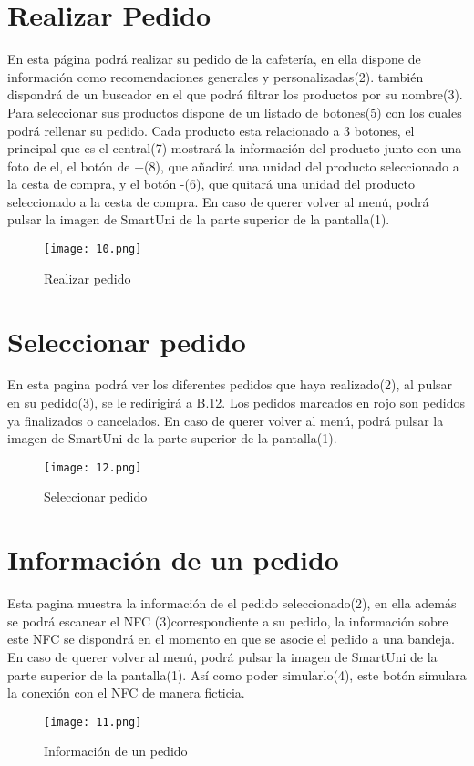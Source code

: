 \documentclass[12pt]{report}
\begin{document}
\begin{appendices}
\section{Realizar Pedido}
En esta página podrá realizar su pedido de la cafetería, en ella dispone de información como recomendaciones generales y personalizadas(2). también dispondrá de un buscador en el que podrá filtrar los productos por su nombre(3). Para seleccionar sus productos dispone de un listado de botones(5) con los cuales podrá rellenar su pedido. Cada producto esta relacionado a 3 botones, el principal que es el central(7) mostrará la información del producto junto con una foto de el, el botón de +(8), que añadirá una unidad del producto seleccionado a la cesta de compra, y el botón -(6), que quitará una unidad del producto seleccionado a la cesta de compra. En caso de querer volver al menú, podrá pulsar la imagen de SmartUni de la parte superior de la pantalla(1).
\begin{figure}[H]
    \centering
    \texttt{[image: 10.png]}
    \caption{Realizar pedido}
    \label{fig:enter-label}
\end{figure}

\section{Seleccionar pedido}
En esta pagina podrá ver los diferentes pedidos que haya realizado(2), al pulsar en su pedido(3), se le redirigirá a B.12. Los pedidos marcados en rojo son pedidos ya finalizados o cancelados. En caso de querer volver al menú, podrá pulsar la imagen de SmartUni de la parte superior de la pantalla(1).
\begin{figure}[H]
    \centering
    \texttt{[image: 12.png]}
    \caption{Seleccionar pedido}
    \label{fig:enter-label}
\end{figure}

\section{Información de un pedido}
Esta pagina muestra la información de el pedido seleccionado(2), en ella además se podrá escanear el NFC (3)correspondiente a su pedido, la información sobre este NFC se dispondrá en el momento en que se asocie el pedido a una bandeja. En caso de querer volver al menú, podrá pulsar la imagen de SmartUni de la parte superior de la pantalla(1). Así como poder simularlo(4), este botón simulara la conexión con el NFC de manera ficticia.
\begin{figure}[H]
    \centering
    \texttt{[image: 11.png]}
    \caption{Información de un pedido}
    \label{fig:enter-label}
\end{figure}



\end{appendices}
\end{document}
